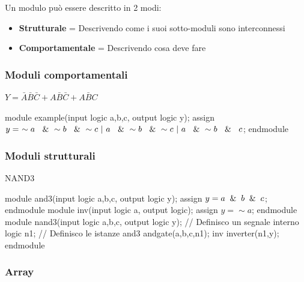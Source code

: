 \documentclass{article}
\begin{document}
\vspace{8pt}

Un modulo può essere descritto in 2 modi:
\begin{itemize}
    \item \textbf{Strutturale} = Descrivendo come i suoi sotto-moduli sono interconnessi
    \item \textbf{Comportamentale} = Descrivendo cosa deve fare
\end{itemize}

\subsubsection{Moduli comportamentali}

\begin{algorithm}[ht]
\caption{$Y=\bar{A}\bar{B}\bar{C}+A\bar{B}\bar{C}+A\bar{B}C$}
\begin{algorithmic}
\State module example(input logic a,b,c, output logic y);
   \State assign $y =\  \sim a\  \And\  \sim b \ \And \ \sim c\  | \ a\  \And \ \sim b\  \And\ \sim c \ |\  a\  \And \ \sim b\  \And \ c$;
\State endmodule
\end{algorithmic}
\end{algorithm}

\newpage

\subsubsection{Moduli strutturali}

\begin{algorithm}[ht]
\caption{NAND3}
\begin{algorithmic}
\State module and3(input logic a,b,c, output logic y);
   \State assign $y =a \And b \And c$;
\State endmodule
\State
\State module inv(input logic a, output logic);
   \State assign $y =\sim a$;
\State endmodule
\State
\State module nand3(input logic a,b,c, output logic y);
    \State // Definisco un segnale interno
   \State logic n1;
    \State
   \State // Definisco le istanze
   \State and3 andgate(a,b,c,n1);
   \State inv inverter(n1,y);
\State endmodule
\end{algorithmic}
\end{algorithm}

\vspace{-20pt}

\subsubsection{Array}
\end{document}
